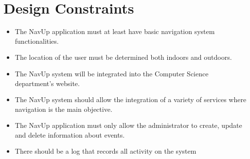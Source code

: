 \documentclass[12pt,a4paper]{article}
\begin{document}


\tableofcontents
\newpage

\section{Design Constraints}
	\begin{itemize}
		\item The NavUp application must at least have basic navigation system functionalities.
		\item The location  of the user must be determined both indoors and outdoors.
		\item The NavUp system will be integrated into the Computer Science department's website.
		\item The NavUp system should allow the integration of a variety of services where navigation is the main objective.
		\item The NavUp application must only allow the administrator to create, update and delete information about events.
		\item There should be a log that records all activity on the system
	\end{itemize}
\end{document}
